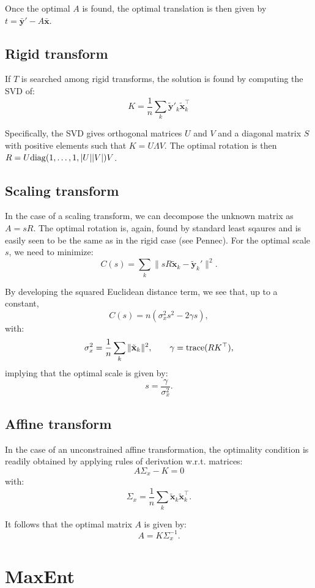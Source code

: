 \documentclass{article}
\def\x{{\mathbf{x}}}
\def\y{{\mathbf{y}}}
\begin{document}
Once the optimal $A$ is found, the optimal translation is then given by $t = \bar{\y}'- A \bar{\x}$.


\subsection{Rigid transform}

If $T$ is searched among rigid transforms, the solution is found by computing the SVD of:
$$
K = \frac{1}{n}\sum_k \tilde{\y}'_k \tilde{\x}_k^\top
$$

Specifically, the SVD gives orthogonal matrices $U$ and $V$ and a diagonal matrix $S$  with positive elements such that $K = U \Lambda V$. The optimal rotation is then $R = U {\rm diag}(1,\ldots,1,|U||V|) V$.


\subsection{Scaling transform}

In the case of a scaling transform, we can decompose the unknown matrix as $A=sR$. The optimal rotation is, again, found by standard least sqaures and is easily seen to be the same as in the rigid case (see Pennec). For the optimal scale $s$, we need to minimize:
$$
C(s) = 
\sum_k \|s R\tilde{\x}_k-\tilde{\y}_k'\|^2
.
$$

By developing the squared Euclidean distance term, we see that, up to a constant,
$$
C(s)
= 
n(\sigma_x^2 s^2 - 2\gamma s),
$$
with:
$$
\sigma_x^2 = \frac{1}{n} \sum_k \|\tilde{\x}_k\|^2,
\qquad
\gamma = {\rm trace}(RK^\top)
,
$$
implying that the optimal scale is given by:
$$
s = \frac{\gamma}{\sigma^2_x}
.
$$


\subsection{Affine transform}

In the case of an unconstrained affine transformation, the optimality condition is readily obtained by applying rules of derivation w.r.t. matrices:
$$
A \Sigma_x - K = 0
$$
with:
$$
\Sigma_x = \frac{1}{n} \sum_k \tilde{\x}_k \tilde{\x}_k^\top
.
$$

It follows that the optimal matrix $A$ is given by:
$$
A = K \Sigma_x^{-1}
.
$$




\section{MaxEnt}
\end{document}
